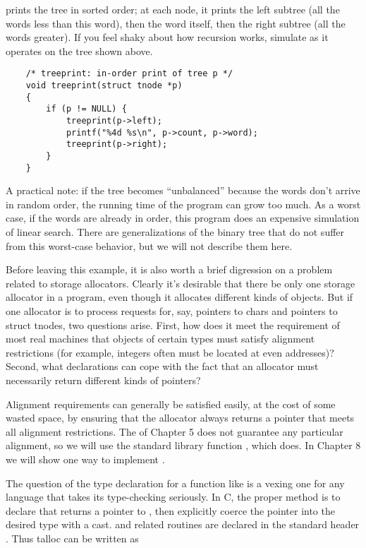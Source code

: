  prints the tree in sorted order; at each node, it prints the left subtree (all the words less than this word), then the word itself, then the right subtree (all the words greater).
If you feel shaky about how recursion works, simulate  as it operates on the tree shown above.
\begin{lstlisting}
	/* treeprint: in-order print of tree p */
	void treeprint(struct tnode *p)
	{
		if (p != NULL) {
			treeprint(p->left);
			printf("%4d %s\n", p->count, p->word);
			treeprint(p->right);
		}
	}
\end{lstlisting}
A practical note: if the tree becomes ``unbalanced'' because the words don't arrive in random order, the running time of the program can grow too much.
As a worst case, if the words are already in order, this program does an expensive simulation of linear search.
There are generalizations of the binary tree that do not suffer from this worst-case behavior, but we will not describe them here.

Before leaving this example, it is also worth a brief digression on a problem related to storage allocators.
Clearly it's desirable that there be only one storage allocator in a program, even though it allocates different kinds of objects.
But if one allocator is to process requests for, say, pointers to chars and pointers to struct tnodes, two questions arise.
First, how does it meet the requirement of most real machines that objects of certain types must satisfy alignment restrictions (for example, integers often must be located at even addresses)?
Second, what declarations can cope with the fact that an allocator must necessarily return different kinds of pointers?

Alignment requirements can generally be satisfied easily, at the cost of some wasted space, by ensuring that the allocator always returns a pointer that meets all alignment restrictions.
The  of Chapter 5 does not guarantee any particular alignment, so we will use the standard library function , which does.
In Chapter 8 we will show one way to implement .

The question of the type declaration for a function like  is a vexing one for any language that takes its type-checking seriously.
In C, the proper method is to declare that  returns a pointer to , then explicitly coerce the pointer into the desired type with a cast.
 and related routines are declared in the standard header . Thus talloc can be written as

